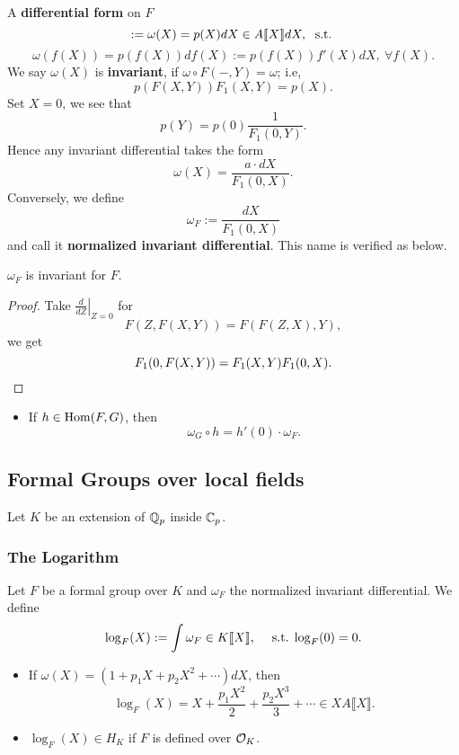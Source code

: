 A \textbf{differential form} on $F$ 
\[:= \omega(X) = p(X)dX\in A\llbracket X \rrbracket dX,\ \;\mathrm{s.t.}\;\]
\[\omega(f(X)) = p(f(X))df(X) := p(f(X))f'(X)dX,\ \forall f(X).\]
We say $\omega(X)$ is \textbf{invariant}, if $\omega\circ F(-, Y) = \omega$;
i.e,  \[p(F(X, Y))F_1(X, Y) = p(X).\]
Set $X = 0$, we see that \[p(Y) = p(0)\frac{1}{F_1(0, Y)}.\]
Hence any invariant differential takes the form \[\omega(X) = \frac{a\cdot dX}{F_1(0, X)}.\]
Conversely, we define \[\omega_F := \frac{dX}{F_1(0, X)}\] and call it \textbf{normalized invariant differential}. This name is verified as below.
\begin{proposition}
    $\omega_F$ is invariant for $F$.
\end{proposition}
\begin{proof}
    Take $\left.\frac{d}{dZ}\right|_{Z = 0}$ for \[F(Z, F(X, Y)) = F(F(Z, X), Y),\]
    we get \[F_1(0, F(X, Y)) = F_1(X, Y)F_1(0, X).\qedhere\]
\end{proof}
\begin{itemize}
    \item If $h \in \operatorname{Hom}(F, G)$,
    then \[\omega_G\circ h = h'(0)\cdot\omega_F.\] 
\end{itemize}

\subsection{Formal Groups over local fields}

Let $K$ be an extension of $\mathbb{Q}_p$ inside $\mathbb{C}_p$.

\subsubsection{The Logarithm}
Let $F$ be a formal group over $K$ and $\omega_F$ the normalized invariant differential.
We define \[\log_F(X) := \int\omega_F\in K\llbracket X \rrbracket,\quad \;\mathrm{s.t.}\; \log_F(0) = 0.\]
\begin{itemize}
    \item If $\omega(X) = (1 + p_1X + p_2X^2 + \cdots)dX$, then \[\log_F(X) = X + \frac{p_1X^2}{2} + \frac{p_2X^3}{3} + \cdots\in X A\llbracket X  \rrbracket.\]
    \item $\log_F(X)\in H_K$ if $F$ is defined over $\mathcal{O}_K$.
\end{itemize}


